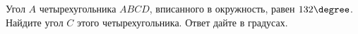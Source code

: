 \begin{ex}
	\begin{condition}
		Угол \( A  \) четырехугольника \( ABCD \), вписанного в окружность, равен \( 132\degree  \). Найдите угол \( C  \) этого четырехугольника. Ответ дайте в градусах.
	\end{condition}
\end{ex}